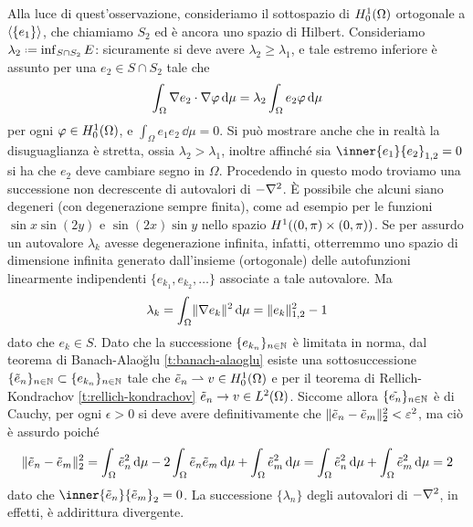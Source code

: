 Alla luce di quest'osservazione, consideriamo il sottospazio di $\sobHc[1]{\Omega}$ ortogonale a $\gen{\{e_1\}}$, che chiamiamo $S_2$ ed è ancora uno spazio di Hilbert.
Consideriamo $\lambda_2\defeq\inf_{S\cap S_2}E$: sicuramente si deve avere $\lambda_2\ge\lambda_1$, e tale estremo inferiore è assunto per una $e_2\in S\cap S_2$ tale che
\begin{equation}
    \int_\Omega\scalar{\grad e_2}{\grad\phi}\,\dd\mu=\lambda_2\int_\Omega e_2\phi\,\dd\mu
\end{equation}
per ogni $\phi\in\sobHc[1]{\Omega}$, e $\int_\Omega e_1e_2\,\dd\mu=0$.
Si può mostrare anche che in realtà la disuguaglianza è stretta, ossia $\lambda_2>\lambda_1$, inoltre affinch\'e sia $\inner{e_1}{e_2}_{1,2}=0$ si ha che $e_2$ deve cambiare segno in $\Omega$.
Procedendo in questo modo troviamo una successione non decrescente di autovalori di $-\lap$.
È possibile che alcuni siano degeneri (con degenerazione sempre finita), come ad esempio per le funzioni $\sin x\sin(2y)$ e $\sin(2x)\sin y$ nello spazio $\sobH[1]{(0,\pi)\times(0,\pi)}$.
Se per assurdo un autovalore $\lambda_k$ avesse degenerazione infinita, infatti, otterremmo uno spazio di dimensione infinita generato dall'insieme (ortogonale) delle autofunzioni linearmente indipendenti $\{e_{k_1},e_{k_2},\dotsc\}$ associate a tale autovalore.
Ma
\begin{equation}
    \lambda_k=\int_\Omega\norm{\grad e_k}^2\,\dd\mu=\norm{e_k}_{1,2}^2-1
\end{equation}
dato che $e_k\in S$.
Dato che la successione $\{e_{k_n}\}_{n\in\N}$ è limitata in norma, dal teorema di Banach-Alao\u{g}lu \ref{t:banach-alaoglu} esiste una sottosuccessione $\{\tilde{e}_n\}_{n\in\N}\subset\{e_{k_n}\}_{n\in\N}$ tale che $\tilde{e}_n\weakto v\in\sobHc[1]{\Omega}$ e per il teorema di Rellich-Kondrachov \ref{t:rellich-kondrachov} $\tilde{e}_n\to v\in\leb[2]{\Omega}$.
Siccome allora $\{\tilde{e_n}\}_{n\in\N}$ è di Cauchy, per ogni $\epsilon>0$ si deve avere definitivamente che $\norm{\tilde{e}_n-\tilde{e}_m}_2^2<\epsilon^2$, ma ciò è assurdo poich\'e
\begin{equation}
    \norm{\tilde{e}_n-\tilde{e}_m}_2^2=
    \int_\Omega\tilde{e}_n^2\,\dd\mu-2\int_\Omega\tilde{e}_n\tilde{e}_m\,\dd\mu+\int_\Omega\tilde{e}_m^2\,\dd\mu=
    \int_\Omega\tilde{e}_n^2\,\dd\mu+\int_\Omega\tilde{e}_m^2\,\dd\mu=
    2
\end{equation}
dato che $\inner{\tilde{e}_n}{\tilde{e}_m}_2=0$.
La successione $\{\lambda_n\}$ degli autovalori di $-\lap$, in effetti, è addirittura divergente.
